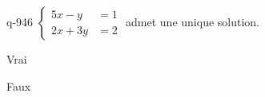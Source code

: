 \begin{truefalse}{q-946}
$\begin{cases}5x-y &= 1 \\ 2x+3y &= 2\end{cases}$ admet une unique solution.
\item* Vrai
\item Faux
\end{truefalse}

